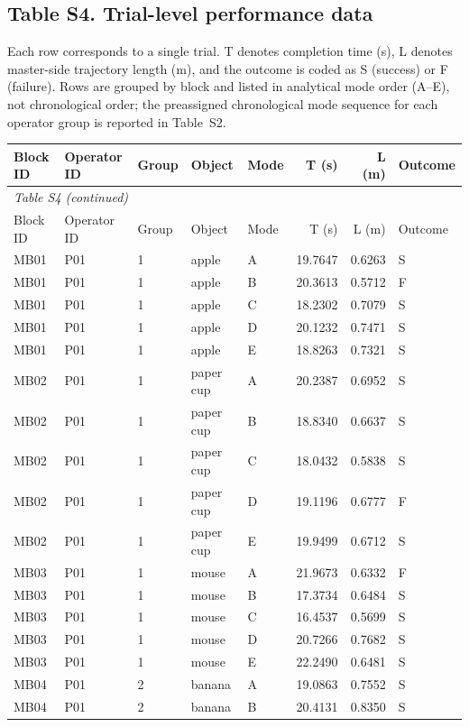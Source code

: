 \documentclass[11pt]{article}
\begin{document}
\subsection*{Table S4. Trial-level performance data}
Each row corresponds to a single trial. T denotes completion time (s), L denotes master-side trajectory length (m), and the outcome is coded as S (success) or F (failure). Rows are grouped by block and listed in analytical mode order (A--E), not chronological order; the preassigned chronological mode sequence for each operator group is reported in Table~S2.
\scriptsize
\begin{longtable}{lll llrrl}
\toprule
Block ID & Operator ID & Group & Object & Mode & T (s) & L (m) & Outcome \\
\midrule
\endfirsthead
\multicolumn{8}{l}{\textit{Table S4 (continued)}} \\
\toprule
Block ID & Operator ID & Group & Object & Mode & T (s) & L (m) & Outcome \\
\midrule
\endhead
MB01 & P01 & 1 & apple & A & 19.7647 & 0.6263 & S \\
MB01 & P01 & 1 & apple & B & 20.3613 & 0.5712 & F \\
MB01 & P01 & 1 & apple & C & 18.2302 & 0.7079 & S \\
MB01 & P01 & 1 & apple & D & 20.1232 & 0.7471 & S \\
MB01 & P01 & 1 & apple & E & 18.8263 & 0.7321 & S \\
MB02 & P01 & 1 & paper cup & A & 20.2387 & 0.6952 & S \\
MB02 & P01 & 1 & paper cup & B & 18.8340 & 0.6637 & S \\
MB02 & P01 & 1 & paper cup & C & 18.0432 & 0.5838 & S \\
MB02 & P01 & 1 & paper cup & D & 19.1196 & 0.6777 & F \\
MB02 & P01 & 1 & paper cup & E & 19.9499 & 0.6712 & S \\
MB03 & P01 & 1 & mouse & A & 21.9673 & 0.6332 & F \\
MB03 & P01 & 1 & mouse & B & 17.3734 & 0.6484 & S \\
MB03 & P01 & 1 & mouse & C & 16.4537 & 0.5699 & S \\
MB03 & P01 & 1 & mouse & D & 20.7266 & 0.7682 & S \\
MB03 & P01 & 1 & mouse & E & 22.2490 & 0.6481 & S \\
MB04 & P01 & 2 & banana & A & 19.0863 & 0.7552 & S \\
MB04 & P01 & 2 & banana & B & 20.4131 & 0.8350 & S \\

\end{longtable}
\end{document}
